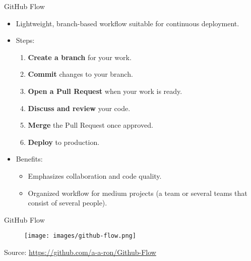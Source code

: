 \documentclass{beamer}
\begin{document}
\begin{frame}{GitHub Flow}
  \begin{itemize}
      \item Lightweight, branch-based workflow suitable for continuous deployment.
      \item Steps:
      \begin{enumerate}
          \item \textbf{Create a branch} for your work.
          \item \textbf{Commit} changes to your branch.
          \item \textbf{Open a Pull Request} when your work is ready.
          \item \textbf{Discuss and review} your code.
          \item \textbf{Merge} the Pull Request once approved.
          \item \textbf{Deploy} to production.
      \end{enumerate}
      \item Benefits:
      \begin{itemize}
        \item Emphasizes collaboration and code quality.
        \item Organized workflow for medium projects (a team or several teams that consist of several people).
      \end{itemize}
  \end{itemize}
\end{frame}

\begin{frame}{GitHub Flow}
  \begin{figure}[h]
    \centering
    \texttt{[image: images/github-flow.png]}
    \label{fig:github-flow}
  \end{figure}
  {\footnotesize Source: \href{https://github.com/a-a-ron/Github-Flow}{https://github.com/a-a-ron/Github-Flow}}
\end{frame}
\end{document}

